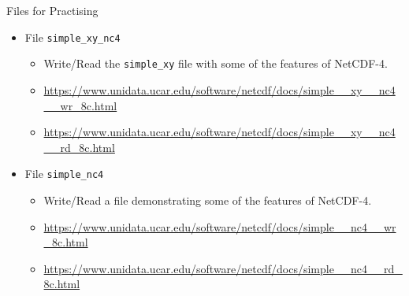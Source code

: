 \documentclass[compress,11pt,xcolor=svgnames,aspectratio=169]{beamer}
\begin{document}
\begin{frame}[fragile]{Files for Practising}

\begin{itemize}
\setlength\itemsep{0.4cm}

  \item File \verb|simple_xy_nc4|\\[0.3cm]
    \begin{itemize}
    \setlength\itemsep{0.2cm}
      \item {\footnotesize Write/Read the \verb|simple_xy| file with some of the features of NetCDF-4.}
      \item {\scriptsize \url{https://www.unidata.ucar.edu/software/netcdf/docs/simple__xy__nc4__wr_8c.html}}
      \item {\scriptsize \url{https://www.unidata.ucar.edu/software/netcdf/docs/simple__xy__nc4__rd_8c.html}}
    \end{itemize}

  \item File \verb|simple_nc4|\\[0.3cm]
    \begin{itemize}
    \setlength\itemsep{0.2cm}
      \item {\footnotesize Write/Read a file demonstrating some of the features of NetCDF-4.}
      \item {\scriptsize \url{https://www.unidata.ucar.edu/software/netcdf/docs/simple__nc4__wr_8c.html}}
      \item {\scriptsize \url{https://www.unidata.ucar.edu/software/netcdf/docs/simple__nc4__rd_8c.html}}
    \end{itemize}

\end{itemize}

\end{frame}
\end{document}
